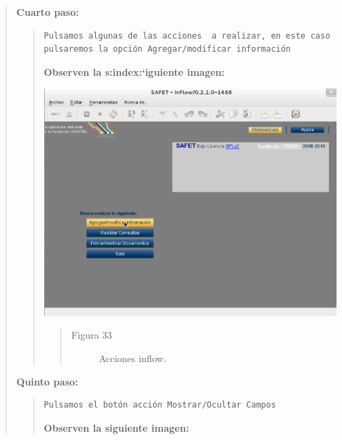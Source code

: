 \documentclass[letterpaper,11pt,spanish]{sphinxmanual}
\begin{document}
\begin{quote}
\begin{quote}
\begin{quote}
\begin{description}
\end{description}\end{quote}
\end{quote}

\textbf{Cuarto paso:}
\begin{quote}

\begin{Verbatim}[commandchars=\\\{\}]
Pulsamos algunas de las acciones  a realizar, en este caso pulsaremos la opción Agregar/modificar información
\end{Verbatim}

\textbf{Observen la s:index:{}`iguiente imagen:}

\includegraphics{inflow8.png}
\begin{quote}\begin{description}
\item[{Figura 33}] \leavevmode
Acciones inflow.

\end{description}\end{quote}
\end{quote}

\textbf{Quinto paso:}
\begin{quote}

\begin{Verbatim}[commandchars=\\\{\}]
Pulsamos el botón acción Mostrar/Ocultar Campos
\end{Verbatim}

\textbf{Observen la siguiente imagen:}


\end{quote}
\end{quote}
\end{document}
